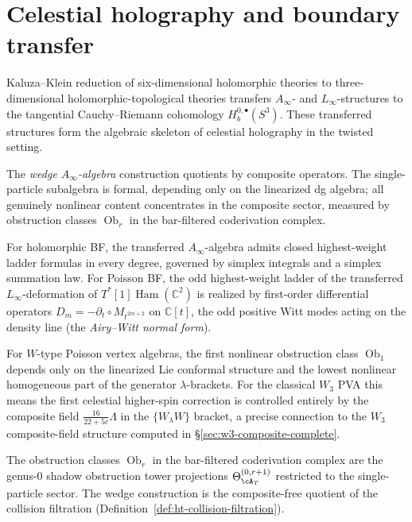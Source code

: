 \section{Celestial holography and boundary transfer}
\label{subsec:celestial-boundary-transfer}

Kaluza--Klein reduction of six-dimensional holomorphic theories to
three-dimensional holomorphic-topological theories transfers
$A_\infty$- and $L_\infty$-structures to the tangential Cauchy--Riemann
cohomology $H_b^{0,\bullet}(S^3)$. These transferred structures form
the algebraic skeleton of celestial holography in the twisted setting.

The \emph{wedge $A_\infty$-algebra} construction quotients by
composite operators. The single-particle subalgebra is formal,
depending only on the linearized dg algebra; all genuinely
nonlinear content concentrates in the composite sector, measured by
obstruction classes $\operatorname{Ob}_r$ in the bar-filtered
coderivation complex.

For holomorphic BF, the transferred $A_\infty$-algebra admits closed
highest-weight ladder formulas in every degree, governed by simplex
integrals and a simplex summation law. For Poisson BF, the
odd highest-weight ladder of the transferred $L_\infty$-deformation of
$T^*[1]\operatorname{Ham}(\mathbb{C}^2)$ is realized by
first-order differential operators
$D_m = -\partial_t \circ M_{t^{2m+2}}$ on $\mathbb{C}[t]$, the
odd positive Witt modes acting on the density line (the
\emph{Airy--Witt normal form}).

For $W$-type Poisson vertex algebras, the first nonlinear
obstruction class $\operatorname{Ob}_1$ depends only on the linearized
Lie conformal structure and the lowest nonlinear homogeneous part of
the generator $\lambda$-brackets. For the classical $W_3$ PVA this
means the first celestial higher-spin correction is controlled entirely
by the composite field $\frac{16}{22+5c}\Lambda$ in the
$\{W_\lambda W\}$ bracket, a precise connection to the $W_3$
composite-field structure computed in
\S\ref{sec:w3-composite-complete}.

\begin{remark}
\label{rem:ht-celestial-obstruction-convolution}
The obstruction classes $\operatorname{Ob}_r$ in the bar-filtered
coderivation complex are the genus-$0$ shadow obstruction tower projections
$\Theta_{\cA_T}^{(0,r+1)}$ restricted to the single-particle
sector. The wedge construction is the composite-free quotient of the
collision filtration
(Definition~\ref{def:ht-collision-filtration}).
\end{remark}


